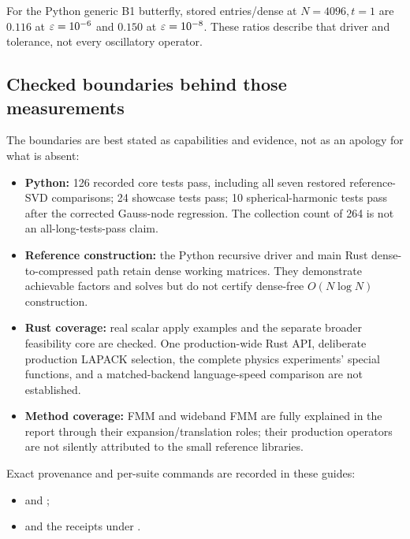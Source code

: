 For the Python generic B1 butterfly, stored entries/dense at $N=4096,t=1$ are $0.116$ at $\varepsilon=10^{-6}$ and $0.150$ at $\varepsilon=10^{-8}$. These ratios describe that driver and tolerance, not every oscillatory operator.

\subsection{Checked boundaries behind those measurements}
The boundaries are best stated as capabilities and evidence, not as an apology for what is absent:
\begin{itemize}
 \item \textbf{Python:} 126 recorded core tests pass, including all seven restored reference-SVD comparisons; 24 showcase tests pass; 10 spherical-harmonic tests pass after the corrected Gauss-node regression. The collection count of 264 is not an all-long-tests-pass claim.
 \item \textbf{Reference construction:} the Python recursive driver and main Rust dense-to-compressed path retain dense working matrices. They demonstrate achievable factors and solves but do not certify dense-free $O(N\log N)$ construction.
 \item \textbf{Rust coverage:} real scalar apply examples and the separate broader feasibility core are checked. One production-wide Rust API, deliberate production LAPACK selection, the complete physics experiments' special functions, and a matched-backend language-speed comparison are not established.
 \item \textbf{Method coverage:} FMM and wideband FMM are fully explained in the report through their expansion/translation roles; their production operators are not silently attributed to the small reference libraries.
\end{itemize}
Exact provenance and per-suite commands are recorded in these guides:
\begin{itemize}
 \item {} and ;
 \item {} and the receipts under .
\end{itemize}

